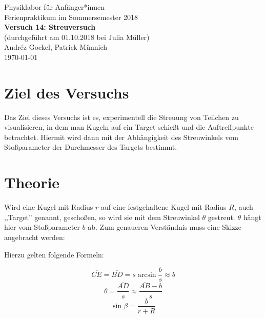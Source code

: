 \documentclass[11pt,a4paper]{article}
\begin{document}
{
\centering 
\large 
Physiklabor für Anf\"anger*innen \\
Ferienpraktikum im Sommersemester 2018 \\[4mm]
\textbf{\LARGE 
Versuch 14: Streuversuch
} \\[3mm]
(durchgef\"uhrt am 01.10.2018 bei Julia M\"uller) \\
Andréz Gockel, Patrick M\"unnich\\
\today \\[10mm]
}

\vspace{50pt}
\tableofcontents
\vspace{22pt}
\listoftables
\vspace{22pt}
\listoffigures
\pagebreak

\section{Ziel des Versuchs}

Das Ziel dieses Versuchs ist es, experimentell die Streuung von Teilchen zu visualisieren, in dem man Kugeln auf ein Target schie\ss t und die Auftreffpunkte betrachtet. Hiermit wird dann mit der Abh\"angigkeit des Streuwinkels vom Sto\ss parameter der Durchmesser des Targets bestimmt.

\section{Theorie}

Wird eine Kugel mit Radius $r$ auf eine festgehaltene Kugel mit Radius $R$, auch ,,Target'' genannt, gescho\ss en, so wird sie mit dem Streuwinkel $\theta$ gestreut. $\theta$ h\"angt hier vom Sto\ss parameter $b$ ab. Zum genaueren Verst\"andnis muss eine Skizze angebracht werden:


Hierzu gelten folgende Formeln:


\begin{equation}
\overline{CE}=\overline{BD}=s\arcsin\frac{b}{s}\approx b\label{eq:1}
\end{equation}
\begin{equation}
\theta=\frac{\overline{AD}}{s}\approx\frac{\overline{AB}-b}{s}\label{eq:2}
\end{equation}
\begin{equation}
\sin\beta=\frac{b}{r+R}\label{eq:3}
\end{equation}
\end{document}
